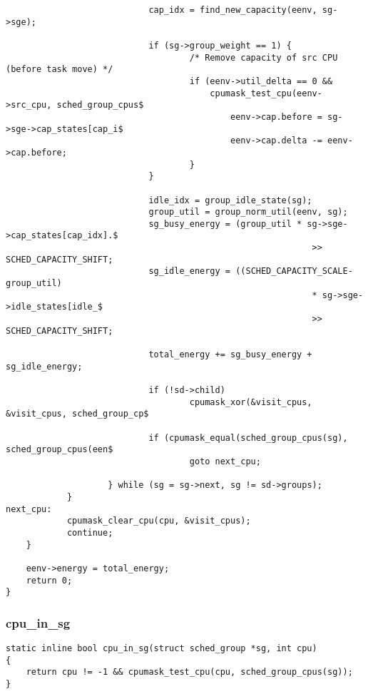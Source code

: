 \documentclass{article}
\begin{document}
\begin{verbatim}
                            cap_idx = find_new_capacity(eenv, sg->sge);

                            if (sg->group_weight == 1) {
                                    /* Remove capacity of src CPU (before task move) */
                                    if (eenv->util_delta == 0 &&
                                        cpumask_test_cpu(eenv->src_cpu, sched_group_cpus$
                                            eenv->cap.before = sg->sge->cap_states[cap_i$
                                            eenv->cap.delta -= eenv->cap.before;
                                    }
                            }

                            idle_idx = group_idle_state(sg);
                            group_util = group_norm_util(eenv, sg);
                            sg_busy_energy = (group_util * sg->sge->cap_states[cap_idx].$
                                                            >> SCHED_CAPACITY_SHIFT;
                            sg_idle_energy = ((SCHED_CAPACITY_SCALE-group_util)
                                                            * sg->sge->idle_states[idle_$
                                                            >> SCHED_CAPACITY_SHIFT;

                            total_energy += sg_busy_energy + sg_idle_energy;

                            if (!sd->child)
                                    cpumask_xor(&visit_cpus, &visit_cpus, sched_group_cp$

                            if (cpumask_equal(sched_group_cpus(sg), sched_group_cpus(een$
                                    goto next_cpu;

                    } while (sg = sg->next, sg != sd->groups);
            }
next_cpu:
            cpumask_clear_cpu(cpu, &visit_cpus);
            continue;
    }

    eenv->energy = total_energy;
    return 0;
}
\end{verbatim}

\subsubsection{cpu\_in\_sg}

\begin{verbatim}
static inline bool cpu_in_sg(struct sched_group *sg, int cpu)
{
    return cpu != -1 && cpumask_test_cpu(cpu, sched_group_cpus(sg));
}
\end{verbatim}
\end{document}
